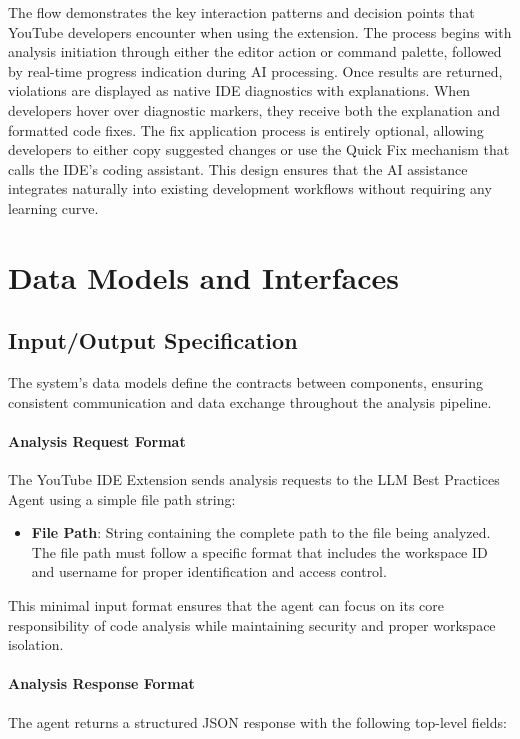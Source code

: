 \begin{spacing}{1.2}
The flow demonstrates the key interaction patterns and decision points that YouTube developers encounter when using the extension. The process begins with analysis initiation through either the editor action or command palette, followed by real-time progress indication during AI processing. Once results are returned, violations are displayed as native IDE diagnostics with explanations. When developers hover over diagnostic markers, they receive both the explanation and formatted code fixes. The fix application process is entirely optional, allowing developers to either copy suggested changes or use the Quick Fix mechanism that calls the IDE's coding assistant. This design ensures that the AI assistance integrates naturally into existing development workflows without requiring any learning curve.


\section{Data Models and Interfaces}

\subsection{Input/Output Specification}
The system's data models define the contracts between components, ensuring consistent communication and data exchange throughout the analysis pipeline.

\paragraph{Analysis Request Format}
The YouTube IDE Extension sends analysis requests to the LLM Best Practices Agent using a simple file path string:

\begin{itemize}
    \item \textbf{File Path}: String containing the complete path to the file being analyzed. The file path must follow a specific format that includes the workspace ID and username for proper identification and access control.
\end{itemize}

This minimal input format ensures that the agent can focus on its core responsibility of code analysis while maintaining security and proper workspace isolation.

\paragraph{Analysis Response Format}
The agent returns a structured JSON response with the following top-level fields:


\end{spacing}
